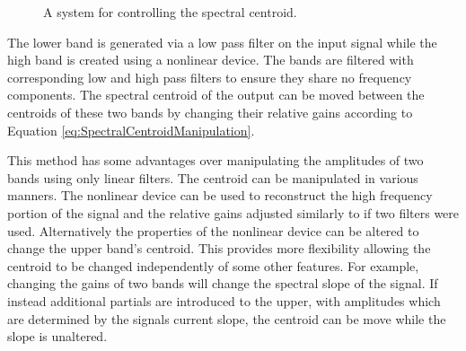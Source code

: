 			\begin{figure}[h!]
				\centering
				\caption{A system for controlling the spectral centroid.}
				\label{fig:TwoBandSpectralCentroidSystem}
			\end{figure}

			The lower band is generated via a low pass filter on the input signal while the high band is
			created using a nonlinear device. The bands are filtered with corresponding low and high pass
			filters to ensure they share no frequency components. The spectral centroid of the output can be
			moved between the centroids of these two bands by changing their relative gains according to
			Equation \ref{eq:SpectralCentroidManipulation}.

			This method has some advantages over manipulating the amplitudes of two bands using only linear
			filters. The centroid can be manipulated in various manners. The nonlinear device can be used to
			reconstruct the high frequency portion of the signal and the relative gains adjusted similarly to
			if two filters were used.  Alternatively the properties of the nonlinear device can be altered to
			change the upper band's centroid.  This provides more flexibility allowing the centroid to be
			changed independently of some other features. For example, changing the gains of two bands will
			change the spectral slope of the signal. If instead additional partials are introduced to the
			upper, with amplitudes which are determined by the signals current slope, the centroid can be move
			while the slope is unaltered.

